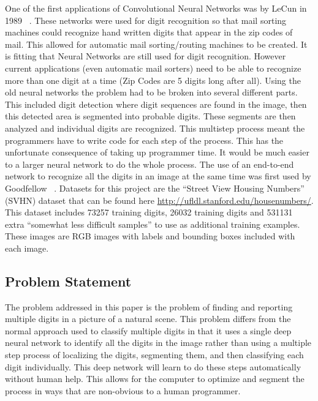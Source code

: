 \documentclass[12pt,twocolumn,letterpaper]{article}
\begin{document}
One of the first applications of Convolutional Neural Networks was by LeCun in 
1989 ~\cite{lecun-89c}. These networks were used for digit recognition so that mail 
sorting machines could recognize hand written digits that appear in the zip codes of 
mail. This allowed for automatic mail sorting/routing machines to be created. 
It is fitting that Neural Networks are still 
used for digit recognition. However current applications (even automatic mail sorters) 
need to be able to recognize more than one digit at a time (Zip Codes are 5 
digits long after all). Using the old neural networks the problem had to be broken into 
several different parts. This included digit detection where digit sequences are 
found in the image, then this detected area is segmented into probable digits. 
These segments are then analyzed and individual digits are recognized. This 
multistep process meant the programmers have to write code for each step of the 
process. This has the unfortunate consequence of taking up programmer time. It 
would be much easier to a larger neural network to do the whole process. The use 
of an end-to-end network to recognize all the digits in an image at the same time 
was first used by Goodfellow \etal ~\cite{goodfellow}.
Datasets for this project are the ``Street View Housing Numbers'' (SVHN) dataset that 
can be found here \url{http://ufldl.stanford.edu/housenumbers/}. This dataset includes 
73257 training digits, 26032 training digits and 531131 extra ``somewhat less 
difficult samples'' to use as additional training examples. These images are RGB 
images with labels and bounding boxes included with each image.

\subsection{Problem Statement}
The problem addressed in this paper is the problem of finding and reporting multiple
digits in a picture of a natural scene. This problem differs from the normal 
approach used to classify multiple digits in that it uses a single deep neural 
network to identify all the digits in the image rather than using a multiple 
step process of localizing the digits, segmenting them, and then classifying each 
digit individually. This deep network will learn to do these steps automatically 
without human help. This allows for the computer to optimize and segment the 
process in ways that are non-obvious to a human programmer.
\end{document}
